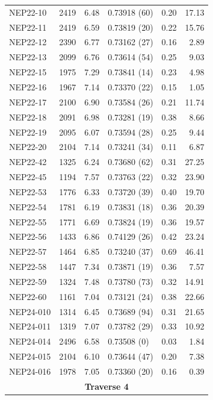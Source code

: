 \begin{landscape}
\begin{minipage}{0.48\linewidth}
\begin{longtable}{l r r l r r}
            NEP22-10 & 2419 & 6.48 & 0.73918 \hfill (60) & 0.20 & 17.13 \\
            NEP22-11 & 2419 & 6.59 & 0.73819 \hfill (20) & 0.22 & 15.76 \\
            NEP22-12 & 2390 & 6.77 & 0.73162 \hfill (27) & 0.16 & 2.89 \\
            NEP22-13 & 2099 & 6.76 & 0.73614 \hfill (54) & 0.25 & 9.03 \\
            NEP22-15 & 1975 & 7.29 & 0.73841 \hfill (14) & 0.23 & 4.98 \\
            NEP22-16 & 1967 & 7.14 & 0.73370 \hfill (22) & 0.15 & 1.05 \\
            NEP22-17 & 2100 & 6.90 & 0.73584 \hfill (26) & 0.21 & 11.74 \\
            NEP22-18 & 2091 & 6.98 & 0.73281 \hfill (19) & 0.38 & 8.66 \\
            NEP22-19 & 2095 & 6.07 & 0.73594 \hfill (28) & 0.25 & 9.44 \\
            NEP22-20 & 2104 & 7.14 & 0.73241 \hfill (34) & 0.11 & 6.87 \\
            NEP22-42 & 1325 & 6.24 & 0.73680 \hfill (62) & 0.31 & 27.25 \\
            NEP22-45 & 1194 & 7.57 & 0.73763 \hfill (22) & 0.32 & 23.90 \\
            NEP22-53 & 1776 & 6.33 & 0.73720 \hfill (39) & 0.40 & 19.70 \\
            NEP22-54 & 1781 & 6.19 & 0.73831 \hfill (18) & 0.36 & 20.39 \\
            NEP22-55 & 1771 & 6.69 & 0.73824 \hfill (19) & 0.36 & 19.57 \\
            NEP22-56 & 1433 & 6.86 & 0.74129 \hfill (26) & 0.42 & 23.24 \\
            NEP22-57 & 1464 & 6.85 & 0.73240 \hfill (37) & 0.69 & 46.41 \\
            NEP22-58 & 1447 & 7.34 & 0.73871 \hfill (19) & 0.36 & 7.57 \\
            NEP22-59 & 1324 & 7.48 & 0.73780 \hfill (73) & 0.32 & 14.91 \\
            NEP22-60 & 1161 & 7.04 & 0.73121 \hfill (24) & 0.38 & 22.66 \\
            NEP24-010 & 1314 & 6.45 & 0.73689 \hfill (94) & 0.31 & 21.65 \\
            NEP24-011 & 1319 & 7.07 & 0.73782 \hfill (29) & 0.33 & 10.92 \\
            NEP24-014 & 2496 & 6.58 & 0.73508 \hfill (0) & 0.03 & 1.84 \\
            NEP24-015 & 2104 & 6.10 & 0.73644 \hfill (47) & 0.20 & 7.38 \\
            NEP24-016 & 1978 & 7.05 & 0.73360 \hfill (20) & 0.16 & 0.39 \\
            \hline
            \multicolumn{6}{c}{\textbf{Traverse 4}} \\


\end{longtable}
\end{minipage}
\end{landscape}
